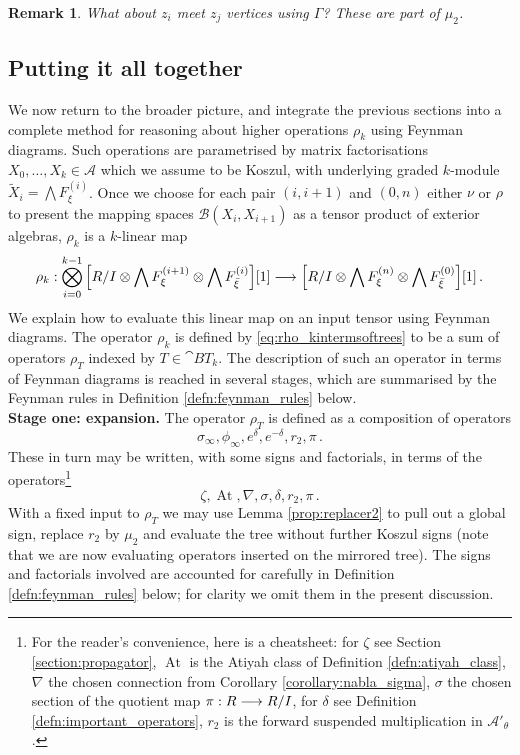 \documentclass[english,letter paper,12pt,leqno]{article}
\theoremstyle{example}
\newtheorem{remark}[theorem]{Remark}
\numberwithin{equation}{section}
\def\AA{\mathcal{A}}
\def\BB{\mathcal{B}}
\def\be{\begin{equation}}
\def\ee{\end{equation}}
\DeclareMathOperator{\vAt}{At}
\begin{document}
\begin{remark} What about $z_i$ meet $z_j$ vertices using $\Gamma$? These are part of $\mu_2$.
\end{remark}

\subsection{Putting it all together}\label{section:feynman_diagram_4}

We now return to the broader picture, and integrate the previous sections into a complete method for reasoning about higher operations $\rho_k$ using Feynman diagrams. Such operations are parametrised by matrix factorisations $X_0,\ldots,X_k \in \AA$ which we assume to be Koszul, with underlying graded $k$-module $\widetilde{X}_i = \bigwedge F^{(i)}_\xi$. Once we choose for each pair $(i,i+1)$ and $(0,n)$ either $\nu$ or $\rho$ to present the mapping spaces $\BB(X_i, X_{i+1})$ as a tensor product of exterior algebras, $\rho_k$ is a $k$-linear map
\be
\rho_k: \bigotimes_{i=0}^{k-1}\Big[ R/I \otimes \bigwedge F_{\xi}^{(i+1)} \otimes \bigwedge F_{\Bar{\xi}}^{(i)} \Big][1] \lto \Big[ R/I \otimes \bigwedge F_{\xi}^{(n)} \otimes \bigwedge F_{\Bar{\xi}}^{(0)} \Big] [1]\,.
\ee
We explain how to evaluate this linear map on an input tensor using Feynman diagrams. The operator $\rho_k$ is defined by \eqref{eq:rho_kintermsoftrees} to be a sum of operators $\rho_T$ indexed by $T \in \cat{BT}_k$. The description of such an operator in terms of Feynman diagrams is reached in several stages, which are summarised by the Feynman rules in Definition \ref{defn:feynman_rules} below.
\\

\textbf{Stage one: expansion.} The operator $\rho_T$ is defined as a composition of operators
\be
\sigma_\infty, \phi_\infty, e^{\delta}, e^{-\delta}, r_2, \pi\,.
\ee
These in turn may be written, with some signs and factorials, in terms of the operators\footnote{For the reader's convenience, here is a cheatsheet: for $\zeta$ see Section \ref{section:propagator}, $\vAt$ is the Atiyah class of Definition \ref{defn:atiyah_class}, $\nabla$ the chosen connection from Corollary \ref{corollary:nabla_sigma}, $\sigma$ the chosen section of the quotient map $\pi: R \longrightarrow R/I$, for $\delta$ see Definition \ref{defn:important_operators}, $r_2$ is the forward suspended multiplication in $\AA'_\theta$.}
\be\label{eq:goodlist_2}
\zeta, \vAt, \nabla, \sigma, \delta, r_2, \pi\,.
\ee
With a fixed input to $\rho_T$ we may use Lemma \ref{prop:replacer2} to pull out a global sign, replace $r_2$ by $\mu_2$ and evaluate the tree without further Koszul signs (note that we are now evaluating operators inserted on the mirrored tree). The signs and factorials involved are accounted for carefully in Definition \ref{defn:feynman_rules} below; for clarity we omit them in the present discussion.
\end{document}
